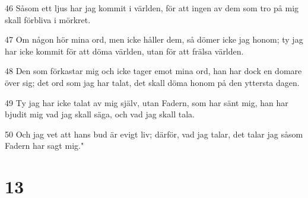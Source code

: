 \par 46 Såsom ett ljus har jag kommit i världen, för att ingen av dem som tro på mig skall förbliva i mörkret.
\par 47 Om någon hör mina ord, men icke håller dem, så dömer icke jag honom; ty jag har icke kommit för att döma världen, utan för att frälsa världen.
\par 48 Den som förkastar mig och icke tager emot mina ord, han har dock en domare över sig; det ord som jag har talat, det skall döma honom på den yttersta dagen.
\par 49 Ty jag har icke talat av mig själv, utan Fadern, som har sänt mig, han har bjudit mig vad jag skall säga, och vad jag skall tala.
\par 50 Och jag vet att hans bud är evigt liv; därför, vad jag talar, det talar jag såsom Fadern har sagt mig."

\chapter{13}

